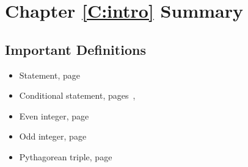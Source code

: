 \section{Chapter \ref{C:intro} Summary}
\subsection*{Important Definitions}
\begin{multicols}{2}
\begin{itemize}
\item Statement, page~\pageref*{D:prop}
\item Conditional statement, pages~\pageref*{PA:prop}, ~\pageref*{D:conditional}
\item Even integer, page~\pageref*{D:even}
\item Odd integer, page~\pageref*{D:even}
\item Pythagorean triple, page~\pageref*{exer:pythag}
\end{itemize}
\end{multicols}

\endinput



